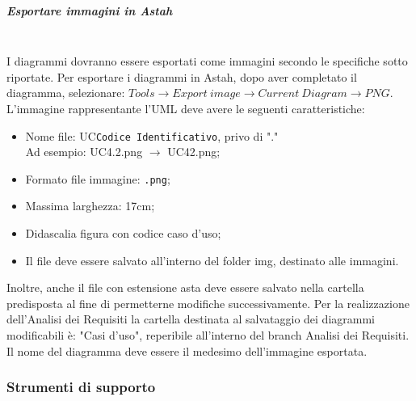 \subparagraph{Esportare immagini in Astah}\mbox{}\\
I diagrammi dovranno essere esportati come immagini secondo le specifiche sotto riportate. Per esportare i diagrammi in Astah, dopo aver completato il diagramma, selezionare: $Tools \rightarrow Export\ image \rightarrow Current\ Diagram \rightarrow PNG$.
L'immagine rappresentante l'UML deve avere le seguenti caratteristiche:
\begin{itemize}
\item Nome file: UC\texttt{Codice Identificativo}, privo di "."\\
Ad esempio: UC4.2.png $\rightarrow$ UC42.png;
\item Formato file immagine: \texttt{.png};
\item Massima larghezza: 17cm;
\item Didascalia figura con codice caso d'uso;
\item Il file deve essere salvato all'interno del folder img, destinato alle immagini.
\end{itemize}
Inoltre, anche il file con estensione asta deve essere salvato nella cartella predisposta al fine di permetterne modifiche successivamente. 
Per la realizzazione dell'Analisi dei Requisiti la cartella destinata al salvataggio dei diagrammi modificabili è: "Casi d'uso", reperibile all'interno del {branch} Analisi dei Requisiti. Il nome del diagramma deve essere il medesimo dell'immagine esportata.

\subsubsection{Strumenti di supporto} 

